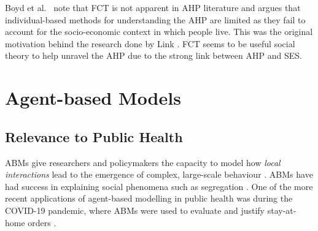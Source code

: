 Boyd et al.~\cite{Boyd2021} note that \ac{FCT} is not apparent in \ac{AHP} literature and argues that individual-based methods for understanding the \ac{AHP} are limited as they fail to account for the socio-economic context in which people live. This was the original motivation behind the research done by Link \cite{FCTorigin}. \ac{FCT} seems to be useful social theory to help unravel the \ac{AHP} due to the strong link between \ac{AHP} and \ac{SES}.





\section{Agent-based Models}


\subsection{Relevance to Public Health}



\ac{ABM}s give researchers and policymakers the capacity to model how \textit{local interactions} lead to the emergence of complex, large-scale behaviour \cite{abmEpstein, abmGeneral}. \ac{ABM}s have had success in explaining social phenomena such as segregation \cite{schelling}.  One of the more recent applications of agent-based modelling in public health was during the COVID-19 pandemic, where \ac{ABM}s were used to evaluate and justify stay-at-home orders \cite{covidABM}. 

